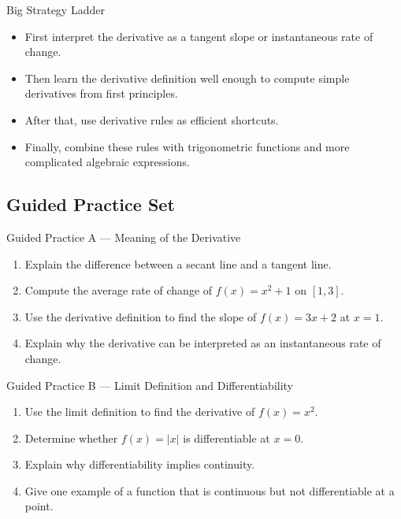 \documentclass[11pt]{article}
\begin{document}
\begin{summarybox}{Big Strategy Ladder}
\begin{itemize}
    \item First interpret the derivative as a tangent slope or instantaneous rate of change.
    \item Then learn the derivative definition well enough to compute simple derivatives from first principles.
    \item After that, use derivative rules as efficient shortcuts.
    \item Finally, combine these rules with trigonometric functions and more complicated algebraic expressions.
\end{itemize}
\end{summarybox}

\newpage
\subsection{Guided Practice Set}

\begin{practicebox}{Guided Practice A --- Meaning of the Derivative}
\begin{enumerate}
    \item Explain the difference between a secant line and a tangent line.
    \item Compute the average rate of change of $f(x)=x^2+1$ on $[1,3]$.
    \item Use the derivative definition to find the slope of $f(x)=3x+2$ at $x=1$.
    \item Explain why the derivative can be interpreted as an instantaneous rate of change.
\end{enumerate}
\end{practicebox}

\begin{practicebox}{Guided Practice B --- Limit Definition and Differentiability}
\begin{enumerate}
    \item Use the limit definition to find the derivative of $f(x)=x^2$.
    \item Determine whether $f(x)=|x|$ is differentiable at $x=0$.
    \item Explain why differentiability implies continuity.
    \item Give one example of a function that is continuous but not differentiable at a point.
\end{enumerate}
\end{practicebox}
\end{document}
